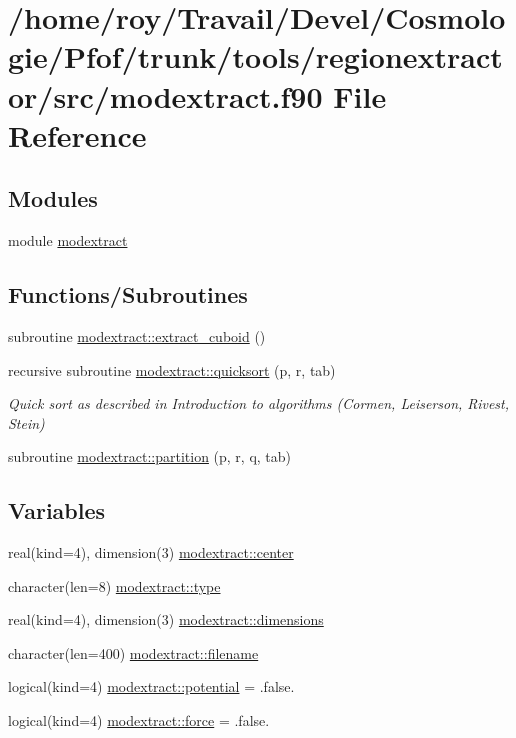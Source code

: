 \hypertarget{modextract_8f90}{}\section{/home/roy/\+Travail/\+Devel/\+Cosmologie/\+Pfof/trunk/tools/regionextractor/src/modextract.f90 File Reference}
\label{modextract_8f90}
\subsection*{Modules}
\begin{DoxyCompactItemize}
\item 
module \hyperlink{namespacemodextract}{modextract}
\end{DoxyCompactItemize}
\subsection*{Functions/\+Subroutines}
\begin{DoxyCompactItemize}
\item 
subroutine \hyperlink{namespacemodextract_ab52bfa146aa7f8575cb591e9920e9ff8}{modextract\+::extract\+\_\+cuboid} ()
\item 
recursive subroutine \hyperlink{namespacemodextract_ae2727d931e75af1a5b9d77819493e6d0}{modextract\+::quicksort} (p, r, tab)
\begin{DoxyCompactList}\small\item\em Quick sort as described in Introduction to algorithms (Cormen, Leiserson, Rivest, Stein) \end{DoxyCompactList}\item 
subroutine \hyperlink{namespacemodextract_ab98682bafefede4abc0ad57bd1288abf}{modextract\+::partition} (p, r, q, tab)
\end{DoxyCompactItemize}
\subsection*{Variables}
\begin{DoxyCompactItemize}
\item 
real(kind=4), dimension(3) \hyperlink{namespacemodextract_a58cf95edf95f11f9e6d8f589d4d93c8a}{modextract\+::center}
\item 
character(len=8) \hyperlink{namespacemodextract_af65545877ed74e44b340c563fb91e81c}{modextract\+::type}
\item 
real(kind=4), dimension(3) \hyperlink{namespacemodextract_ab5bee6c90bf98302903d0eee1434ea93}{modextract\+::dimensions}
\item 
character(len=400) \hyperlink{namespacemodextract_ab30082cee9f7c8893bad2fc07cd9a65c}{modextract\+::filename}
\item 
logical(kind=4) \hyperlink{namespacemodextract_a0bd93be7d411f7058ed49057de38d60f}{modextract\+::potential} = .false.
\item 
logical(kind=4) \hyperlink{namespacemodextract_a7b759ca92c494942296f343b61e4b2eb}{modextract\+::force} = .false.
\end{DoxyCompactItemize}
